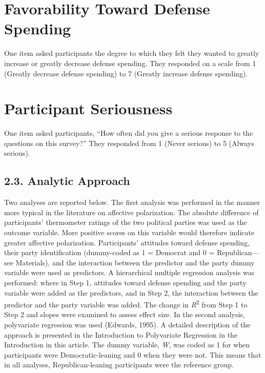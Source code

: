 \documentclass[authordate, meta]{jote-new-article}
\begin{document}
	\section{\textbf{Favorability Toward Defense Spending}}



	One item asked participants the degree to which they felt they wanted to greatly increase or greatly decrease defense spending. They responded on a scale from 1 (Greatly decrease defense spending) to 7 (Greatly increase defense spending).



	\section{\textbf{Participant Seriousness}}



	One item asked participants, “How often did you give a serious response to the questions on this survey?” They responded from 1 (Never serious) to 5 (Always serious).



	\subsection{2.3. Analytic Approach}



	Two analyses are reported below. The first analysis was performed in the manner more typical in the literature on affective polarization. The absolute difference of participants' thermometer ratings of the two political parties was used as the outcome variable. More positive scores on this variable would therefore indicate greater affective polarization. Participants' attitudes toward defense spending, their party identification (dummy-coded as 1 = Democrat and 0 = Republican—see Materials), and the interaction between the predictor and the party dummy variable were used as predictors. A hierarchical multiple regression analysis was performed: where in Step 1, attitudes toward defense spending and the party variable were added as the predictors, and in Step 2, the interaction between the predictor and the party variable was added. The change in \emph{R}\textsuperscript{2} from Step 1 to Step 2 and slopes were examined to assess effect size. In the second analysis, polyvariate regression was used (Edwards, 1995). A detailed description of the approach is presented in the Introduction to Polyvariate Regression in the Introduction in this article. The dummy variable, \emph{W}, was coded as 1 for when participants were Democratic-leaning and 0 when they were not. This means that in all analyses, Republican-leaning participants were the reference group.
\end{document}
